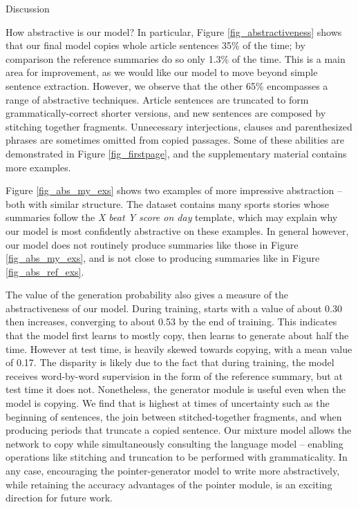 \documentclass[11pt,a4paper]{article}
\begin{document}
\begin{section}{Discussion}
\begin{subsection}{How abstractive is our model?}
In particular, Figure \ref{fig_abstractiveness} shows that our final model copies whole article sentences 35\% of the time; by comparison the reference summaries do so only 1.3\% of the time.
This is a main area for improvement, as we would like our model to move beyond simple sentence extraction.
However, we observe that the other 65\% encompasses a range of abstractive techniques.
Article sentences are truncated to form grammatically-correct shorter versions, and new sentences are composed by stitching together fragments.
Unnecessary interjections, clauses and parenthesized phrases are sometimes omitted from copied passages.
Some of these abilities are demonstrated in Figure \ref{fig_firstpage}, and the supplementary material contains more examples.

Figure \ref{fig_abs_my_exs} shows two examples of more impressive abstraction -- both with similar structure.
The dataset contains many sports stories whose summaries follow the \textit{X beat Y score on day} template, which may explain why our model is most confidently abstractive on these examples.
In general however, our model does not routinely produce summaries like those in Figure \ref{fig_abs_my_exs}, and is not close to producing summaries like in Figure \ref{fig_abs_ref_exs}.

The value of the generation probability  also gives a measure of the abstractiveness of our model.
During training,  starts with a value of about 0.30 then increases, converging to about 0.53 by the end of training. 
This indicates that the model first learns to mostly copy, then learns to generate about half the time.
However at test time,  is heavily skewed towards copying, with a mean value of 0.17.
The disparity is likely due to the fact that during training, the model receives word-by-word supervision in the form of the reference summary, but at test time it does not.
Nonetheless, the generator module is useful even when the model is copying.
We find that  is highest at times of uncertainty such as the beginning of sentences, the join between stitched-together fragments, and when producing periods that truncate a copied sentence.
Our mixture model allows the network to copy while simultaneously consulting the language model -- enabling operations like stitching and truncation to be performed with grammaticality. 
In any case, encouraging the pointer-generator model to write more abstractively, while retaining the accuracy advantages of the pointer module, is an exciting direction for future work.
\end{subsection}
\end{section} 
\end{document}

